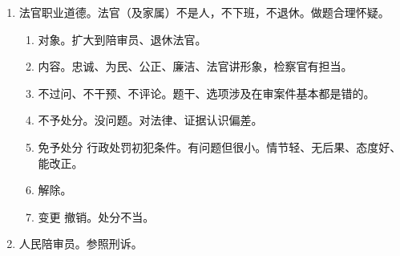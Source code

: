 \begin{enumerate}
  \item 法官职业道德。法官（及家属）不是人，不下班，不退休。做题合理怀疑。
        \begin{enumerate}
          \item 对象。扩大到陪审员、退休法官。
          \item 内容。忠诚、为民、公正、廉洁、法官讲形象，检察官有担当。
          \item 不过问、不干预、不评论。题干、选项涉及在审案件基本都是错的。
          \item 不予处分。没问题。对法律、证据认识偏差。
          \item 免予处分 \ydy 行政处罚初犯条件。有问题但很小。情节轻、无后果、态度好、能改正。
          \item 解除。
          \item 变更 \hz 撤销。处分不当。
        \end{enumerate}
  \item 人民陪审员。参照刑诉。
\end{enumerate}
